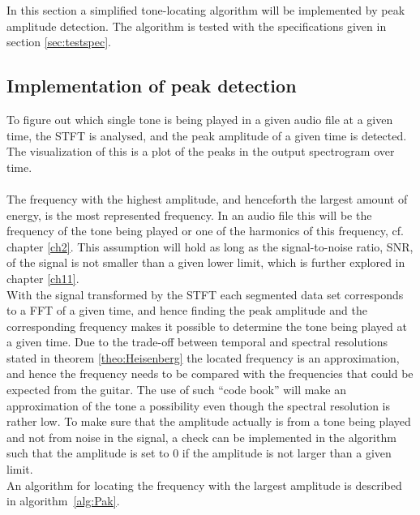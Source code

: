 \label{sec:peak_detection}
In this section a simplified tone-locating algorithm will be implemented by peak amplitude detection.
The algorithm is tested with the specifications given in section \ref{sec:testspec}.
\subsection{Implementation of peak detection}
To figure out which single tone is being played in a given audio file at a given time, the STFT is analysed, and the peak amplitude of a given time is detected.
The visualization of this is a plot of the peaks in the output spectrogram over time.
\\ \\
The frequency with the highest amplitude, and henceforth the largest amount of energy, is the most represented frequency. 
In an audio file this will be the frequency of the tone being played or one of the harmonics of this frequency, cf. chapter \ref{ch2}.
This assumption will hold as long as the signal-to-noise ratio, SNR, of the signal is not smaller than a given lower limit, which is further explored in chapter \ref{ch11}. \\
With the signal transformed by the STFT each segmented data set corresponds to a FFT of a given time, and hence finding the peak amplitude and the corresponding frequency makes it possible to determine the tone being played at a given time. Due to the trade-off between temporal and spectral resolutions stated in theorem \ref{theo:Heisenberg} the located frequency is an approximation, and hence the frequency needs to be compared with the frequencies that could be expected from the guitar.
The use of such ``code book'' will make an approximation of the tone a possibility even though the spectral resolution is rather low.
\newpage
To make sure that the amplitude actually is from a tone being played and not from noise in the signal, a check can be implemented in the algorithm such that the amplitude is set to $0$ if the amplitude is not larger than a given limit. \\
An algorithm for locating the frequency with the largest amplitude is described in algorithm~\ref{alg:Pak}.

